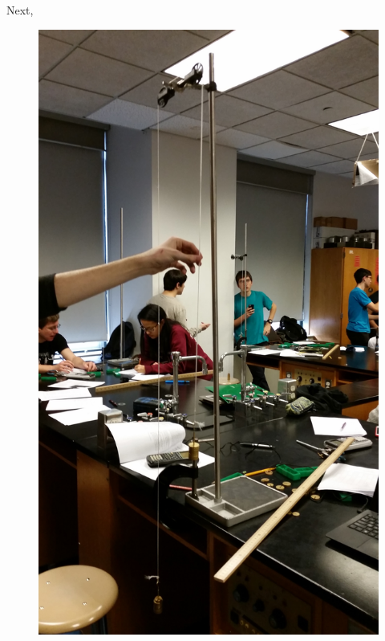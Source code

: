 \documentclass[11pt, titlepage]{article}
\begin{document}
Next, 

\begin{figure}[h]
\includegraphics[scale=0.1, angle=270]{lab1.jpg}
\end{figure}
\end{document}
